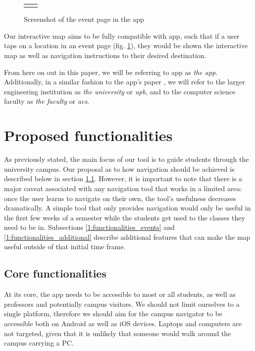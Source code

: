 \begin{figure}
\begin{tabular}{@{}cc@{}}
\begin{minipage}[b]{0.26\textwidth}
                    \captionsetup{labelsep=space, textformat=empty}
                    \caption{Screenshot of the event page in the app}
                    \label{2:fig:event}
                \end{minipage}
            \end{tabular}
        \end{figure}
        
        Our interactive map aims to be fully compatible with \gls{app}, such that if a user taps on a location in an event page (fig. \ref{2:fig:event}), they would be shown the interactive map as well as navigation instructions to their desired destination.
    
        From here on out in this paper, we will be referring to \gls{app} as \textit{the app}. Additionally, in a similar fashion to the app's paper \cite{alexandru2020acsupbmobile}, we will refer to the larger engineering institution as \textit{the university} or \textit{\acrshort{upb}}, and to the computer science faculty as \textit{the faculty} or \textit{\acrshort{acs}}.
    
\section{Proposed functionalities} \label{1:functionalities}

    As previously stated, the main focus of our tool is to guide students through the university campus. Our proposal as to how navigation should be achieved is described below in section \ref{1:functionalities_core}. However, it is important to note that there is a major caveat associated with any navigation tool that works in a limited area: once the user learns to navigate on their own, the tool's usefulness decreases dramatically. A simple tool that only provides navigation would only be useful in the first few weeks of a semester while the students get used to the classes they need to be in. Subsections \ref{1:functionalities_events} and \ref{1:functionalities_additional} describe additional features that can make the map useful outside of that initial time frame.

    \subsection{Core functionalities} \label{1:functionalities_core}
        At its core, the app needs to be accessible to most or all students, as well as professors and potentially campus visitors. We should not limit ourselves to a single platform, therefore we should aim for the campus navigator to be accessible both on Android as well as iOS devices. Laptops and computers are not targeted, given that it is unlikely that someone would walk around the campus carrying a PC.
    
